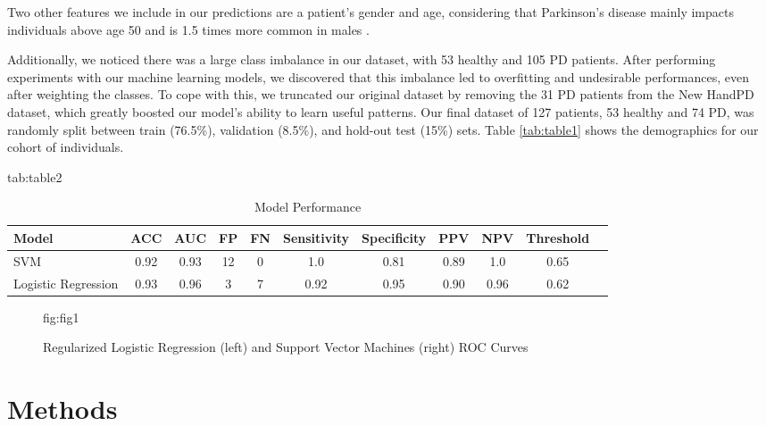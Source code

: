 \documentclass[pmlr,twocolumn,10pt]{jmlr} %
\begin{document}
Two other features we include in our predictions are a patient's gender and age, considering that Parkinson's disease mainly impacts individuals above age 50 and is 1.5 times more common in males \citep{reekes2020sex}. 

Additionally, we noticed there was a large class imbalance in our dataset, with 53 healthy and 105 PD patients. After performing experiments with our machine learning models, we discovered that this imbalance led to overfitting and undesirable performances, even after weighting the classes. To cope with this, we truncated our original dataset by removing the 31 PD patients from the New HandPD dataset, which greatly boosted our model's ability to learn useful patterns. Our final dataset of 127 patients, 53 healthy and 74 PD, was randomly split between train (76.5\%), validation (8.5\%), and hold-out test (15\%) sets. Table \ref{tab:table1} shows the demographics for our cohort of individuals. 

\begin{table*}[hbtp]
\centering 
\floatconts
{tab:table2}
{\caption{Model Performance}}
    {
        \begin{tabular}{lcccccccccc}
        \toprule
        \bfseries Model & \bfseries ACC & \bfseries AUC & \bfseries FP & \bfseries FN & \bfseries Sensitivity & \bfseries Specificity & \bfseries PPV & \bfseries NPV & \bfseries Threshold \\
        \midrule
        SVM & 0.92 & 0.93 & 12 & 0 & 1.0 & 0.81 & 0.89 & 1.0 & 0.65 \\
        Logistic Regression & 0.93 & 0.96 & 3 & 7 & 0.92 & 0.95 & 0.90 & 0.96 & 0.62 \\
        \bottomrule
        \end{tabular}
    }
\end{table*}

\begin{figure*}[hbtp]
\centering
\floatconts
{fig:fig1}
{\caption{Regularized Logistic Regression (left) and Support Vector Machines (right) ROC Curves}}


\end{figure*}

\section{Methods}
\label{Methodology}
\end{document}
